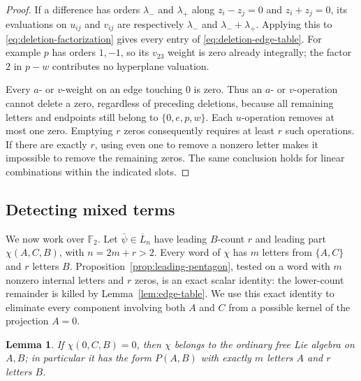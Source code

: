 \documentclass[11pt]{article}
\newcommand{\F}{{\mathbb F_2}}
\newtheorem{lemma}[theorem]{Lemma}
\theoremstyle{definition}
\theoremstyle{remark}
\numberwithin{equation}{section}
\begin{document}
\begin{proof}
If a difference has orders $\lambda_-$ and $\lambda_+$ along
$z_i-z_j=0$ and $z_i+z_j=0$, its evaluations on $u_{ij}$ and $v_{ij}$
are respectively $\lambda_-$ and $\lambda_-+\lambda_+$.  Applying this
to \eqref{eq:deletion-factorization} gives every entry of
\eqref{eq:deletion-edge-table}.  For example $p$ has orders $1,-1$,
so its $v_{23}$ weight is zero already integrally; the factor $2$ in
$p-w$ contributes no hyperplane valuation.

Every $a$- or $v$-weight on an edge touching $0$ is zero.  Thus an
$a$- or $v$-operation cannot delete a zero, regardless of preceding
deletions, because all remaining letters and endpoints still belong to
$\{0,e,p,w\}$.  Each $u$-operation removes at most one zero.  Emptying
$r$ zeros consequently requires at least $r$ such operations.  If there
are exactly $r$, using even one to remove a nonzero letter makes it
impossible to remove the remaining zeros.  The same conclusion holds
for linear combinations within the indicated slots.
\end{proof}

\subsection{Detecting mixed terms}
We now work over $\F$.  Let $\bar\psi\in\overline L_n$ have leading
$B$-count $r$ and leading part $\chi(A,C,B)$, with $n=2m+r>2$.
Every word of $\chi$ has $m$ letters from $\{A,C\}$ and $r$ letters
$B$.  Proposition~\ref{prop:leading-pentagon}, tested on a word with
$m$ nonzero internal letters and $r$ zeros, is an exact scalar identity:
the lower-count remainder is killed by Lemma~\ref{lem:edge-table}.
We use this exact identity to eliminate every component involving
both $A$ and $C$ from a possible kernel of the projection $A=0$.

\begin{lemma}\label{lem:deletion-kernel}
If $\chi(0,C,B)=0$, then $\chi$ belongs to the ordinary free Lie
algebra on $A,B$; in particular it has the form $P(A,B)$ with exactly
$m$ letters $A$ and $r$ letters $B$.
\end{lemma}
\end{document}
